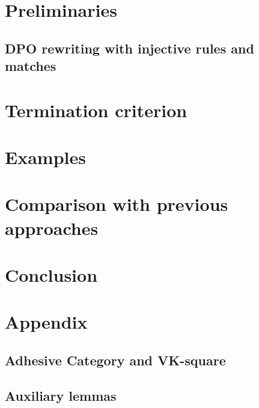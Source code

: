 \documentclass{report}
\begin{document}
\section{Preliminaries} 
\label{subgraph_counting:sec:pre} 
\subsection{DPO rewriting with injective rules and matches} 


 
  
\section{Termination criterion}
\label{subgraph_counting:sec:termination} 

 

\section{Examples} 
\label{subgraph_counting:sec:examples}


  
\section{Comparison with previous approaches}
\label{subgraph_counting:sec:related_work} 


\section{Conclusion}
\label{subgraph_counting:sec:conclusion} 


\section{Appendix}
\label{subgraph_counting:sec:appendix}
\subsection*{Adhesive Category and VK-square}

\subsection*{Auxiliary lemmas}

\end{document}
